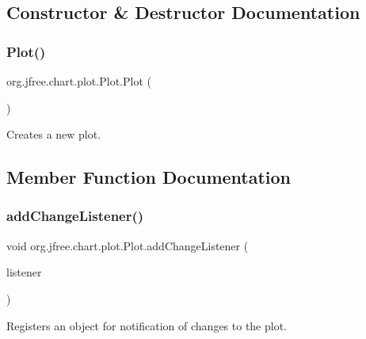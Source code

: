 \subsection{Constructor \& Destructor Documentation}
\mbox{\label{classorg_1_1jfree_1_1chart_1_1plot_1_1_plot_a0ed138c3f00713af62fa19d167e38c8a}} 
\subsubsection{\texorpdfstring{Plot()}{Plot()}}
{\footnotesize\ttfamily org.\+jfree.\+chart.\+plot.\+Plot.\+Plot (\begin{DoxyParamCaption}{ }\end{DoxyParamCaption})\hspace{0.3cm}{\ttfamily [protected]}}

Creates a new plot. 

\subsection{Member Function Documentation}
\mbox{\label{classorg_1_1jfree_1_1chart_1_1plot_1_1_plot_af45cb36f24e3ef3650fcbf387c29e7cc}} 
\subsubsection{\texorpdfstring{add\+Change\+Listener()}{addChangeListener()}}
{\footnotesize\ttfamily void org.\+jfree.\+chart.\+plot.\+Plot.\+add\+Change\+Listener (\begin{DoxyParamCaption}\item[{\mbox{\hyperlink{interfaceorg_1_1jfree_1_1chart_1_1event_1_1_plot_change_listener}{Plot\+Change\+Listener}}}]{listener }\end{DoxyParamCaption})}

Registers an object for notification of changes to the plot.


